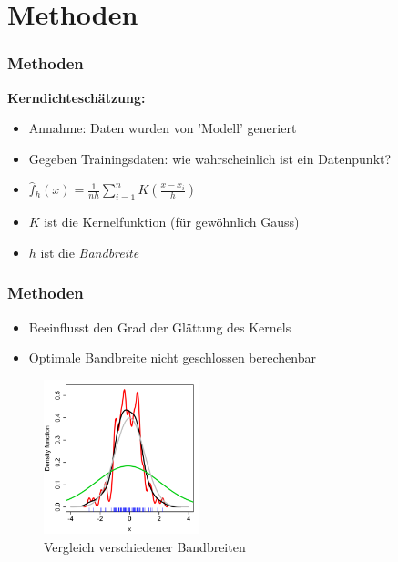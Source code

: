 \section{Methoden}

\begin{frame}
	\frametitle{Methoden}
	
	\textbf{Kerndichteschätzung:}
	\begin{itemize}
		\item Annahme: Daten wurden von 'Modell' generiert
		\item Gegeben Trainingsdaten: wie wahrscheinlich ist ein Datenpunkt?
		\item $\hat{f}_h(x) = \frac{1}{nh}\sum_{i=1}^{n} K(\frac{x - x_i}{h})$
		\item $K$ ist die Kernelfunktion (f\"ur gew\"ohnlich Gauss)
		\item $h$ ist die \textit{Bandbreite}
	\end{itemize}
\end{frame}

\begin{frame}
	\frametitle{Methoden}
	
	\begin{itemize}
		\item Beeinflusst den Grad der Gl\"attung des Kernels
		\item Optimale Bandbreite nicht geschlossen berechenbar
	\end{itemize}
	
	\begin{figure}[p]
		\centering
		\includegraphics[width=0.4\textwidth]{figures/Bandwidth_comparison.png}
		\caption{Vergleich verschiedener Bandbreiten}
		\label{fig:bandwidth}
	\end{figure}
\end{frame}

